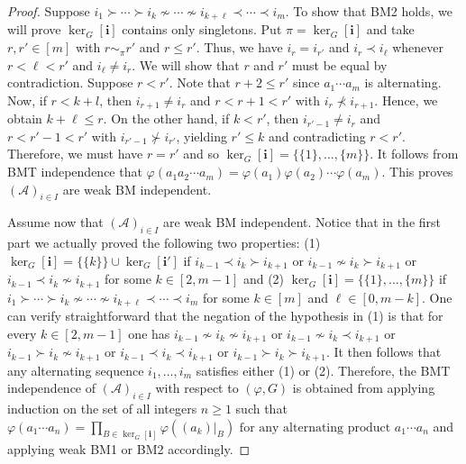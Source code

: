 \documentclass[a4paper,12pt]{extarticle}
\theoremstyle{definition}
\theoremstyle{remark}
\def\AA{\mathcal{A}}
\begin{document}
\begin{proof}
Suppose $i_1\succ \cdots \succ i_k \nsim \cdots \nsim i_{k+\ell}\prec \cdots \prec i_m$. 
%
To show that BM2 holds, we will prove $\ker_G[\bm{i}]$ contains only singletons. 
%
Put $\pi=\ker_G[\bm{i}]$ and take $r,r' \in [m]$ with $r \sim_\pi r'$ and $r \leq r'$. 
%
Thus, we have $i_r=i_{r'}$ and $i_r \prec i_{\ell}$ whenever $r< \ell <r'$ and $i_\ell \neq i_r$. 
%
We will show that $r$ and $r'$ must be equal by contradiction. 
%
Suppose $r < r'$. 
%
Note that $r+2 \leq r'$ since $a_1  \cdots a_m$ is alternating. 
%
Now, if $r<k+l$, then $i_{r+1}\neq i_r$ and $r < r+1 < r'$ with $i_r \nprec i_{r+1}$. 
%
Hence, we obtain $k + \ell \leq r$. 
%
On the other hand, if $k < r' $, then $i_{r'-1} \neq i_r$ and $r < r'-1 < r'$ with $i_{r'-1} \nsucc  i_{r'}$, yielding $r' \leq k$ and contradicting $r < r'$. 
%
Therefore, we must have $r = r'$ and so $\ker_G[\bm{i}]=\{\{1\},\ldots,\{m\}\}$. 
%
It follows from BMT independence that 
%
$
\varphi(a_1 a_2 \cdots a_m ) = \varphi(a_1) \varphi(a_2) \cdots \varphi(a_m).
$
%
This proves $(\AA)_{i\in I}$ are weak BM independent. 
%
%
%
%
%






Assume now that $(\AA)_{i\in I}$ are weak BM independent. 
%
Notice that in the first part we actually proved the following two properties: (1) $\ker_G[\bm{i}] = \{\{k\}\} \cup \ker_G[\bm{i}']$ if $i_{k-1} \prec i_k \succ i_{k+1}$ or $ i_{k-1} \nsim i_k \succ i_{k+1}$ or $ i_{k-1} \prec i_k \nsim i_{k+1}$ for some $k \in [2,m-1]$ and (2) $\ker_G[\bm{i}]=\{\{1\},\ldots,\{m\}\}$ if 
$i_1\succ \cdots \succ i_k \nsim \cdots \nsim i_{k+\ell}\prec \cdots \prec i_m$ for some $k \in [m]$ and $\ell\in [0,m-k]$. 
%
One can verify straightforward that the negation of the hypothesis in (1) is that for every $k \in [2,m-1]$ one has $ i_{k-1} \nsim i_k \nsim i_{k+1}$  or $ i_{k-1} \nsim i_k \prec i_{k+1}$ or  $ i_{k-1} \succ i_k \nsim i_{k+1} $ or $ i_{k-1} \prec i_k \prec i_{k+1}$ or $ i_{k-1} \succ i_k \succ i_{k+1}$. 
%
It then follows that any alternating sequence $i_1,\ldots, i_m$ satisfies either (1) or (2). 
%
Therefore, the BMT independence of $(\AA)_{i\in I}$ with respect to $(\varphi,G)$ is obtained from applying induction on the set of all integers $n \geq 1$ such that $ \varphi(a_1 \cdots a_n )  = \prod_{B \in \ker_G[\bm{i}]} \varphi((a_k)|_B)  \text { for any alternating product } a_1 \cdots a_n$ and applying weak BM1 or BM2 accordingly. 
%
%
% 	
\end{proof}
\end{document}
